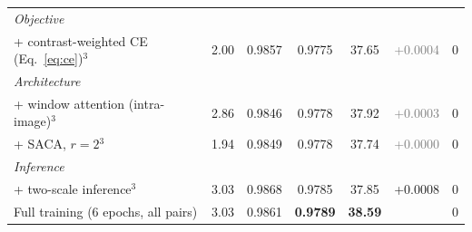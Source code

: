 \begin{table}[htbp]
\begin{tabular}{lcccccc}
\multicolumn{7}{l}{\textit{Objective}} \\
+ contrast-weighted CE (Eq.~\eqref{eq:ce})$^{3}$ & 2.00 & 0.9857 & 0.9775 & 37.65 & \textcolor{gray}{+0.0004} & $0$ \\
\multicolumn{7}{l}{\textit{Architecture}} \\
+ window attention (intra-image)$^{3}$ & 2.86 & 0.9846 & 0.9778 & 37.92 & \textcolor{gray}{+0.0003} & $0$ \\
+ SACA, $r=2$$^{3}$ & 1.94 & 0.9849 & 0.9778 & 37.74 & \textcolor{gray}{+0.0000} & $0$ \\
\multicolumn{7}{l}{\textit{Inference}} \\
+ two-scale inference$^{3}$ & 3.03 & 0.9868 & 0.9785 & 37.85 & +0.0008 & $0$ \\
\midrule
Full training (6 epochs, all pairs) & 3.03 & 0.9861 & \textbf{0.9789} & \textbf{38.59} & & $0$ \\
\bottomrule
\end{tabular}
\end{table}
